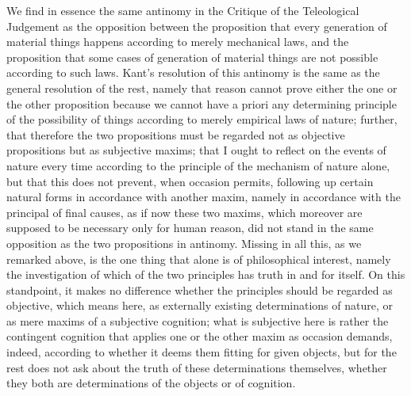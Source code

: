 We find in essence the same antinomy in
the Critique of the Teleological Judgement as
the opposition between the proposition that
every generation of material things happens
according to merely mechanical laws,
and the proposition that some cases
of generation of material things
are not possible according to such laws.
Kant's resolution of this antinomy is the same
as the general resolution of the rest,
namely that reason cannot prove
either the one or the other proposition
because we cannot have a priori
any determining principle of the possibility of things
according to merely empirical laws of nature;
further, that therefore the two propositions must
be regarded not as objective propositions but as subjective maxims;
that I ought to reflect on the events of nature every time
according to the principle of the mechanism of nature alone,
but that this does not prevent, when occasion permits,
following up certain natural forms in accordance with another maxim,
namely in accordance with the principal of final causes,
as if now these two maxims, which moreover are supposed to be
necessary only for human reason,
did not stand in the same opposition as
the two propositions in antinomy.
Missing in all this, as we remarked above,
is the one thing that alone is of philosophical interest,
namely the investigation of which of the two principles
has truth in and for itself.
On this standpoint, it makes no difference
whether the principles should be regarded as objective,
which means here, as externally existing
determinations of nature,
or as mere maxims of a subjective cognition;
what is subjective here is rather the
contingent cognition that applies one or the other maxim
as occasion demands, indeed, according to whether
it deems them fitting for given objects,
but for the rest does not ask about the truth
of these determinations themselves,
whether they both are determinations
of the objects or of cognition.

